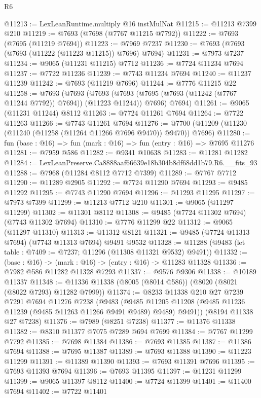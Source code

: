 \begin{lexlean}{R6}
\begin{coremodule}
@11213 := LexLeanRuntime.multiply @16 instMulNat
@11215 := @11213 @7399 @210
@11219 := @7693 (@7698 (@7767 @11215 @7792))
@11222 := @7693 (@7695 (@11219 @7694))
@11223 := @7969 @7237
@11230 := @7693 (@7693 (@7693 (@11222 (@11223 @11215)) @7696) @7694)
@11231 := @7973 @7237
@11234 := @9065 (@11231 @11215) @7712
@11236 := @7724 @11234 @7694
@11237 := @7722 @11236
@11239 := @7743 @11234 @7694
@11240 := @11237 @11239
@11242 := @7693 (@11219 @7696)
@11244 := @7776 @11215 @22
@11258 := @7693
    (@7693
      (@7693 (@7693 (@7695 (@7693 (@11242 (@7767 @11244 @7792)) @7694)) (@11223 @11244)) @7696)
      @7694)
@11261 := @9065 (@11231 @11244) @8112
@11263 := @7724 @11261 @7694
@11264 := @7722 @11263
@11266 := @7743 @11261 @7694
@11276 := @7700 (@11209 (@11230 (@11240 (@11258 (@11264 @11266 @7696 @9470)) @9470)) @7696)
@11280 := fun (base : @16) => fun (mark : @16) => fun (entry : @16) => @7695 @11276
@11281 := @7959 @586
@11282 := @9341 @10638
@11283 := @11281 @11282
@11284 := LexLeanPreserve.Ca8888aaf66639e18b304b8df68dd1b79.R6.__fits_93
@11288 := @7968 (@11284 @8112 @7712 @7399)
@11289 := @7767 @7712
@11290 := @11289 @2905
@11292 := @7724 @11290 @7694
@11293 := @9485 @11292
@11295 := @7743 @11290 @7694
@11296 := @11293 @11295
@11297 := @7973 @7399
@11299 := @11213 @7712 @210
@11301 := @9065 (@11297 @11299)
@11302 := @11301 @8112
@11308 := @9485 (@7724 @11302 @7694) (@7743 @11302 @7694)
@11310 := @7776 @11299 @22
@11312 := @9065 (@11297 @11310)
@11313 := @11312 @8121
@11321 := @9485 (@7724 @11313 @7694) (@7743 @11313 @7694) @9491 @9532
@11328 := @11288 (@9483 (let table : @7409 := @7237; @11296 (@11308 @11321 @9532) @9491))
@11332 := (base : @16) -> (mark : @16) -> (entry : @16) -> @11283 @11328
@11336 := @7982 @586 @11282 @11328 @7293
@11337 := @9576 @9306
@11338 := @10189 @11337
@11348 := @11336 @11338 (@8005 (@8014 @586)) (@8020 (@8021 (@8022 @7293) @11282 @7999))
@11374 := @8233
    @11338
    @210
    @27
    @7239
    @7291
    @7694
    @11276
    @7238
    (@9483
      (@9485 @11205 @11208 (@9485 @11236 @11239 (@9485 @11263 @11266 @9491 @9489) @9489) @9491))
    (@8194 @11338 @27 @7238)
@11376 := @7989 (@8251 @7238)
@11377 := @11376 @11338
@11382 := @8310 @11377 @7075 @7289 @694 @7699
@11384 := @7767 @11299 @7792
@11385 := @7698 @11384
@11386 := @7693 @11385
@11387 := @11386 @7694
@11388 := @7695 @11387
@11389 := @7693 @11388
@11390 := @11223 @11299
@11391 := @11389 @11390
@11393 := @7693 @11391 @7696
@11395 := @7693 @11393 @7694
@11396 := @7693 @11395
@11397 := @11231 @11299
@11399 := @9065 @11397 @8112
@11400 := @7724 @11399
@11401 := @11400 @7694
@11402 := @7722 @11401

\end{coremodule}
\end{lexlean}
